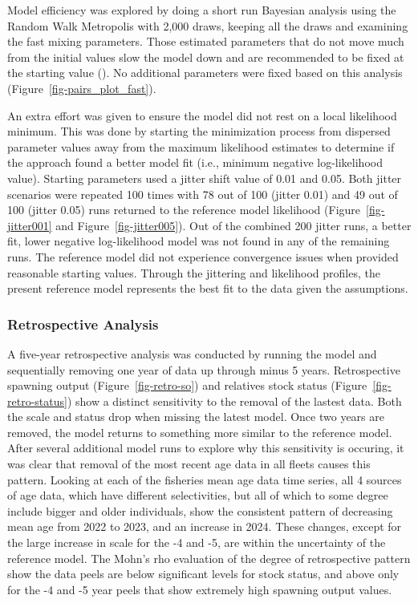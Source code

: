 \documentclass[
]{scrartcl}
\begin{document}
Model efficiency was explored by doing a short run Bayesian analysis
using the Random Walk Metropolis with 2,000 draws, keeping all the draws
and examining the fast mixing parameters. Those estimated parameters
that do not move much from the initial values slow the model down and
are recommended to be fixed at the starting value
(). No
additional parameters were fixed based on this analysis
(Figure~\ref{fig-pairs_plot_fast}).

An extra effort was given to ensure the model did not rest on a local
likelihood minimum. This was done by starting the minimization process
from dispersed parameter values away from the maximum likelihood
estimates to determine if the approach found a better model fit (i.e.,
minimum negative log-likelihood value). Starting parameters used a
jitter shift value of 0.01 and 0.05. Both jitter scenarios were repeated
100 times with 78 out of 100 (jitter 0.01) and 49 out of 100 (jitter
0.05) runs returned to the reference model likelihood
(Figure~\ref{fig-jitter001} and Figure~\ref{fig-jitter005}). Out of the
combined 200 jitter runs, a better fit, lower negative log-likelihood
model was not found in any of the remaining runs. The reference model
did not experience convergence issues when provided reasonable starting
values. Through the jittering and likelihood profiles, the present
reference model represents the best fit to the data given the
assumptions.

\subsubsection{Retrospective Analysis}\label{retrospective-analysis}

A five-year retrospective analysis was conducted by running the model
and sequentially removing one year of data up through minus 5 years.
Retrospective spawning output (Figure~\ref{fig-retro-so}) and relatives
stock status (Figure~\ref{fig-retro-status}) show a distinct sensitivity
to the removal of the lastest data. Both the scale and status drop when
missing the latest model. Once two years are removed, the model returns
to something more similar to the reference model. After several
additional model runs to explore why this sensitivity is occuring, it
was clear that removal of the most recent age data in all fleets causes
this pattern. Looking at each of the fisheries mean age data time
series, all 4 sources of age data, which have different selectivities,
but all of which to some degree include bigger and older individuals,
show the consistent pattern of decreasing mean age from 2022 to 2023,
and an increase in 2024. These changes, except for the large increase in
scale for the -4 and -5, are within the uncertainty of the reference
model. The Mohn's rho evaluation of the degree of retrospective pattern
show the data peels are below significant levels for stock status, and
above only for the -4 and -5 year peels that show extremely high
spawning output values.
\end{document}
